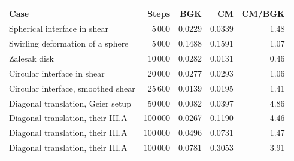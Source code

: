 \begin{tabular}{lrrrr}
\toprule
Case & Steps & BGK & CM & CM/BGK \\
\midrule
Spherical interface in shear & 5\,000 & 0.0229 & 0.0339 & 1.48 \\
Swirling deformation of a sphere & 5\,000 & 0.1488 & 0.1591 & 1.07 \\
Zalesak disk & 10\,000 & 0.0282 & 0.0131 & 0.46 \\
Circular interface in shear & 20\,000 & 0.0277 & 0.0293 & 1.06 \\
Circular interface, smoothed shear & 25\,600 & 0.0139 & 0.0195 & 1.41 \\
Diagonal translation, Geier setup & 50\,000 & 0.0082 & 0.0397 & 4.86 \\
Diagonal translation, their III.A & 100\,000 & 0.0267 & 0.1190 & 4.46 \\
Diagonal translation, their III.A & 100\,000 & 0.0496 & 0.0731 & 1.47 \\
Diagonal translation, their III.A & 100\,000 & 0.0781 & 0.3053 & 3.91 \\
\bottomrule
\end{tabular}
